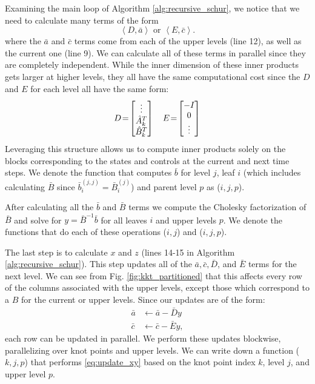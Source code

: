 \documentclass[../root.tex]{subfiles}
\newcommand{\0}{{\transparent{0} \resizebox{\mycellheight}{\mycellheight}{0}}}
\begin{document}
Examining the main loop of Algorithm \ref{alg:recursive_schur}, we notice that we need to 
calculate many terms of the form 
\begin{equation} \label{eq:inner_products}
    \left\langle D, \bar{a} \right\rangle \text{ or } 
    \left\langle E, \bar{c} \right\rangle.
\end{equation}
where the $\bar{a}$ and $\bar{c}$ terms come from each of the upper levels (line 12), 
as well as the current one (line 9).
We can calculate all of
these terms in parallel since they are completely independent. While the inner dimension of 
these inner products gets larger at higher levels, they all have the same computational cost
since the $D$ and $E$ for each level all have the same form: 
\begin{equation}
    \thickmuskip=2mu
    D = \begin{bmatrix}
        \vdots \\ \hat{A}_k^T \\ \hat{B}_k^T
    \end{bmatrix} \quad
    E = \begin{bmatrix}
        -I \\ 0 \\ \vdots
    \end{bmatrix}
\end{equation} 
Leveraging this structure allows us to compute inner products solely on the blocks 
corresponding to the states and controls at the current and next time steps. 
We denote the function that computes $\bar{b}$ for level $j$, leaf $i$ (which includes
calculating $\bar{B}$ since $\bar{b}_i^{(j,j)} = \bar{B}_i^{(j)}$) and 
parent level $p$ as ($i,j,p$).

After calculating all the $\bar{b}$ and $\bar{B}$ terms we compute the Cholesky 
factorization of $\bar{B}$ and solve for $y = \bar{B}^{-1} \bar{b}$ for all leaves $i$
and upper levels $p$.  We denote the functions that do 
each of these operations ($i,j$) and ($i,j,p$).

The last step is to calculate $x$ and $z$ (lines 14-15 in Algorithm
\ref{alg:recursive_schur}). This step updates all of the $\bar{a}, \bar{c}, \bar{D}$, and
$\bar{E}$ terms for the next level. We can see from Fig. \ref{fig:kkt_partitioned} that 
this affects every row of the columns associated with the upper levels, except those which 
correspond to a $B$ for the current or upper levels. 
Since our updates are of the form:
\begin{subequations} \label{eq:update_xy}
\begin{align}
    \bar{a} &\leftarrow \bar{a} - \bar{D} y \\
    \bar{c} &\leftarrow \bar{c} - \bar{E} y ,
\end{align}
\end{subequations}
each row can be updated in parallel. We perform these updates blockwise, parallelizing over
knot points and upper levels. We can write down a function
\mbox{($k,j,p$)} that performs \eqref{eq:update_xy} based on the knot
point index $k$, level $j$, and upper level $p$.
\end{document}
